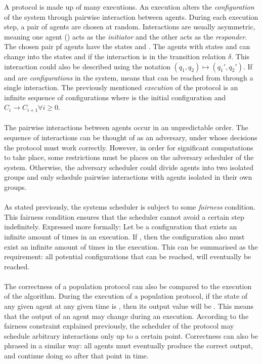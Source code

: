A protocol is made up of many executions. An execution alters the \emph{configuration} of the system through pairwise interaction between agents. During each execution step, a pair of agents  are chosen at random. Interactions are usually asymmetric, meaning one agent () acts as the \emph{initiator} and the other  acts as the \emph{responder}. The chosen pair pf agents have the states  and . The agents with states  and  can change into the states  and  if the interaction  is in the transition relation $\delta$. This interaction could also be described using the notation $(q_1, q_2) \mapsto (q_1', q_2')$.  If  and  are \emph{configurations} in the system,  means that  can be reached from  through a single interaction. The previously mentioned \emph{execution} of the protocol is an infinite sequence of configurations  where  is the initial configuration and $C_i \rightarrow C_{i+1} \forall i \geq 0$. 
\\\\
The pairwise interactions between agents occur in an unpredictable order. The sequence of interactions can be thought of as an adversary, under whose decisions the protocol must work correctly. However, in order for significant computations to take place, some restrictions must be places on the adversary scheduler of the system. Otherwise, the adversary scheduler could divide agents into two isolated groups and only schedule pairwise interactions with agents isolated in their own groups.  
\\\\
As stated previously, the systems scheduler is subject to some \emph{fairness} condition. This fairness condition ensures that the scheduler cannot avoid a certain step indefinitely. Expressed more formally: Let  be a configuration that exists an infinite amount of times in an execution. If , then the configuration  also must exist an infinite amount of times in the execution. This can be summarised as the requirement: all potential configurations that can be reached, will eventually be reached.
\\\\ 
The correctness of a population protocol can also be compared to the execution of the algorithm. During the execution of a population protocol, if the state of any given agent at any given time is , then its output value will be . This means that the output of an agent may change during an execution. According to the fairness constraint explained previously, the scheduler of the protocol may schedule arbitrary interactions only up to a certain point. Correctness can also be phrased in a similar way: all agents must eventually produce the correct output, and continue doing so after that point in time.

